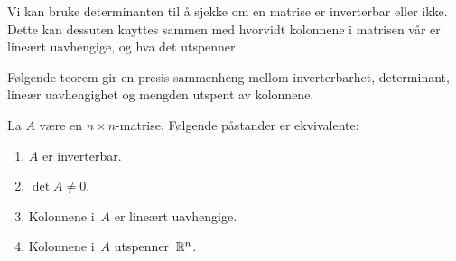 Vi kan bruke determinanten til å sjekke om en matrise er inverterbar
eller ikke.  Dette kan dessuten knyttes sammen med hvorvidt kolonnene
i matrisen vår er lineært uavhengige, og hva det utspenner.

Følgende teorem gir en presis sammenheng mellom inverterbarhet,
determinant, lineær uavhengighet og mengden utspent av kolonnene.

\begin{thm}
\label{thm:karakterisering-inverterbar}
La $A$ være en $n \times n$-matrise.  Følgende påstander er
ekvivalente:
\begin{enumerate}
\item $A$ er inverterbar.
\item $\det A \ne 0$.
\item Kolonnene i~$A$ er lineært uavhengige.
\item Kolonnene i~$A$ utspenner~$\mathbb{R}^n$.
\end{enumerate}
\end{thm}


\kapittelslutt

